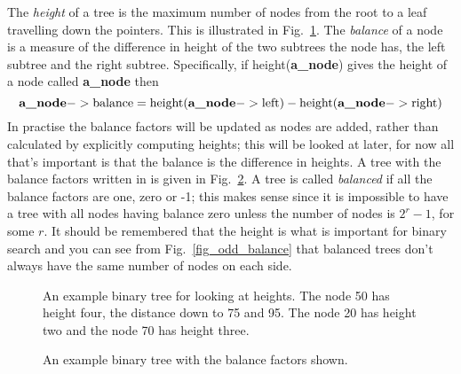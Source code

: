 \documentclass[11pt,a4paper]{scrartcl}
\begin{document}
The {\sl height} of a tree is the maximum number of nodes from the
root to a leaf travelling down the pointers. This is illustrated in
Fig.~\ref{fig_example_tree}. The {\sl balance} of a node is a measure
of the difference in height of the two subtrees the node has, the left
subtree and the right subtree. Specifically, if height({\bf a\_node}) gives the
height of a node called {\bf a\_node} then
\begin{equation}
\mbox{{\bf a\_node}}->\mbox{balance}=\mbox{height}(\mbox{{\bf
    a\_node}}->\mbox{left})-\mbox{height}(\mbox{{\bf
    a\_node}}->\mbox{right})
\end{equation}
In practise the balance factors will be updated as nodes are added,
rather than calculated by explicitly computing heights; this will be
looked at later, for now all that's important is that the balance is
the difference in heights. A tree with the balance factors written in
is given in Fig.~\ref{fig_example_balance}. A tree is called {\sl
  balanced} if all the balance factors are one, zero or -1; this makes
sense since it is impossible to have a tree with all nodes having
balance zero unless the number of nodes is $2^r-1$, for some $r$. It
should be remembered that the height is what is important for binary
search and you can see from Fig.~\ref{fig_odd_balance} that balanced
trees don't always have the same number of nodes on each side.

\begin{figure}
\begin{center}
\end{center}
\caption{An example binary tree for looking at heights. The node 50
  has height four, the distance down to 75 and 95. The node 20 has height two
  and the node 70 has height three.\label{fig_example_tree}}
\end{figure}

\begin{figure}
\begin{center}
\end{center}
\caption{An example binary tree with the balance factors shown.\label{fig_example_balance}}
\end{figure}
\end{document}
